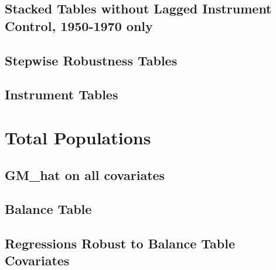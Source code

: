 \documentclass{article}
\begin{document}
\subsection{Stacked Tables without Lagged Instrument Control, 1950-1970 only}


\clearpage


\clearpage
\begin{landscape}
\subsection{Stepwise Robustness Tables}
\clearpage

\clearpage

\clearpage

\clearpage

\clearpage

\clearpage
\subsection{Instrument Tables}
\clearpage

\clearpage

\clearpage

\clearpage

\clearpage

\clearpage
\end{landscape}
\section{Total Populations}
\subsection{GM\_hat on all covariates}

\clearpage
\subsection{Balance Table}

\clearpage
\subsection{Regressions Robust to Balance Table Covariates}
\begin{landscape}

\clearpage

\clearpage

\clearpage

\clearpage
\end{landscape}
\end{document}

